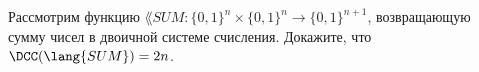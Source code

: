 Рассмотрим функцию $\lang{SUM}: \{0, 1\}^n \times \{0, 1\}^n \to \{0, 1\}^{n + 1}$, возвращающую сумму
чисел в двоичной системе счисления. Докажите, что $\DCC(\lang{SUM}) = 2n$.